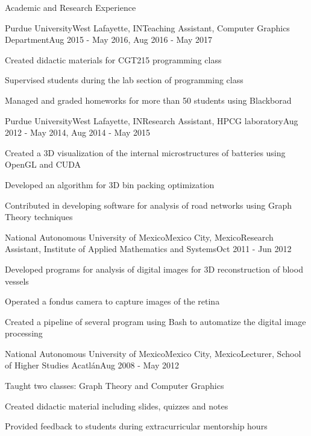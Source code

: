 \documentclass{resume} %
\begin{document}
\begin{rSection}{Academic and Research Experience}

	\begin{rSubsection}{Purdue University}{West Lafayette, IN}{Teaching Assistant, Computer Graphics Department}{Aug 2015 - May 2016, Aug 2016 - May 2017}
	\item Created didactic materials for CGT215 programming class
	\item Supervised students during the lab section of programming class
	\item Managed and graded homeworks for more than 50 students using Blackborad
	\end{rSubsection}

	\begin{rSubsection}{Purdue University}{West Lafayette, IN}{Research Assistant, HPCG laboratory}{Aug 2012 - May 2014, Aug 2014 - May 2015}
	\item Created a 3D visualization of the internal microstructures of batteries using OpenGL and CUDA
	\item Developed an algorithm for 3D bin packing optimization
	\item Contributed in developing software for analysis of road networks using Graph Theory techniques
	\end{rSubsection}
	
	\begin{rSubsection}{National Autonomous University of Mexico}{Mexico City, Mexico}{Research Assistant, Institute of Applied Mathematics and Systems}{Oct 2011 - Jun 2012}
	\item Developed programs for analysis of digital images for 3D reconstruction of blood vessels
	\item Operated a fondus camera to capture images of the retina
	\item Created a pipeline of several program using Bash to automatize the digital image processing
	\end{rSubsection}
	
	\begin{rSubsection}{National Autonomous University of Mexico}{Mexico City, Mexico}{Lecturer, School of Higher Studies Acatl\'{a}n}{Aug 2008 - May 2012}
	\item Taught two classes: Graph Theory and Computer Graphics
	\item Created didactic material including slides, quizzes and notes
	\item Provided feedback to students during extracurricular mentorship hours
	\end{rSubsection}
	

\end{rSection}
\end{document}
